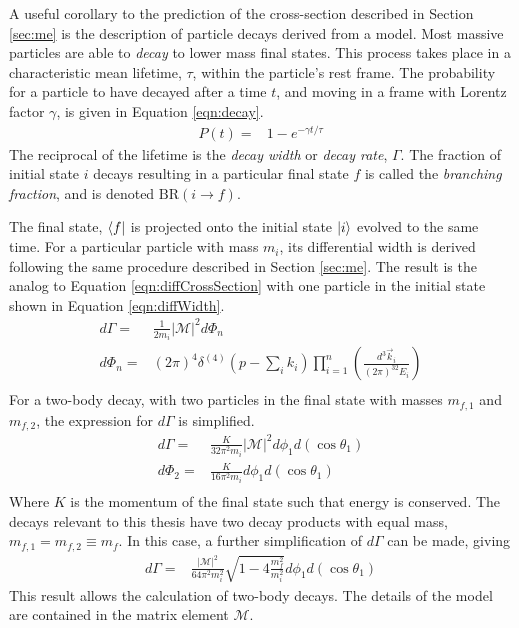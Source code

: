 A useful corollary to the prediction of the cross-section described in Section \ref{sec:me} is the description of particle decays derived from a model.
Most massive particles are able to \emph{decay} to lower mass final states.
This process takes place in a characteristic mean lifetime, $\tau$, within the particle's rest frame.
The probability for a particle to have decayed after a time $t$, and moving in a frame with Lorentz factor $\gamma$, is given in Equation \ref{eqn:decay}.
\begin{equation}\begin{split}\label{eqn:decay}
    P(t)=&1-e^{-\gamma t/\tau}
\end{split}\end{equation}
The reciprocal of the lifetime is the \emph{decay width} or \emph{decay rate}, $\Gamma$.
The fraction of initial state $i$ decays resulting in a particular final state $f$ is called the \emph{branching fraction}, and is denoted $\text{BR}(i\to f)$.


The final state, $\bra{f}$ is projected onto the initial state $\ket{i}$ evolved to the same time.
For a particular particle with mass $m_i$, its differential width is derived following the same procedure described in Section \ref{sec:me}.
The result is the analog to Equation \ref{eqn:diffCrossSection} with one particle in the initial state shown in Equation \ref{eqn:diffWidth}.
\begin{equation}\begin{split}\label{eqn:diffWidth}
    d\Gamma=&\frac{1}{2m_i}|\mathcal{M}|^2d\Phi_n \\
    d\Phi_n=&(2\pi)^4\delta^{(4)}(p-\sum_ik_i)\prod^n_{i=1}\left(\frac{d^3\vec{k}_i}{(2\pi)^32E_i}\right) \\
\end{split}\end{equation}
For a two-body decay, with two particles in the final state with masses $m_{f,1}$ and $m_{f,2}$, the expression for $d\Gamma$ is simplified.
\begin{equation}\begin{split}
    d\Gamma=&\frac{K}{32\pi^2m_i}|\mathcal{M}|^2d\phi_1d(\cos{\theta_1}) \\
    d\Phi_2=&\frac{K}{16\pi^2m_i}d\phi_1d(\cos{\theta_1}) \\
\end{split}\end{equation}
Where $K$ is the momentum of the final state such that energy is conserved.
The decays relevant to this thesis have two decay products with equal mass, $m_{f,1}=m_{f,2}\equiv m_f$.
In this case, a further simplification of $d\Gamma$ can be made, giving
\begin{equation}\begin{split}
    d\Gamma=&\frac{|\mathcal{M}|^2}{64\pi^2m_i^2}\sqrt{1-4\frac{m_f^2}{m_i^2}}d\phi_1d(\cos\theta_1)
\end{split}\end{equation}
This result allows the calculation of two-body decays.
The details of the model are contained in the matrix element $\mathcal{M}$.

